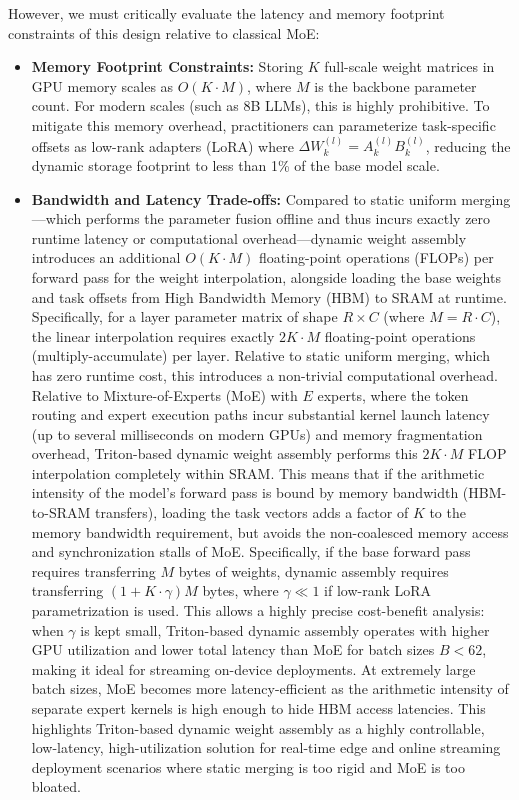 \begin{itemize}
    However, we must critically evaluate the latency and memory footprint constraints of this design relative to classical MoE:
    \begin{itemize}
        \item \textbf{Memory Footprint Constraints:} Storing $K$ full-scale weight matrices in GPU memory scales as $O(K \cdot M)$, where $M$ is the backbone parameter count. For modern scales (such as 8B LLMs), this is highly prohibitive. To mitigate this memory overhead, practitioners can parameterize task-specific offsets as low-rank adapters (LoRA) where $\Delta W_k^{(l)} = A_k^{(l)} B_k^{(l)}$, reducing the dynamic storage footprint to less than 1\% of the base model scale.
        \item \textbf{Bandwidth and Latency Trade-offs:} Compared to static uniform merging---which performs the parameter fusion offline and thus incurs exactly zero runtime latency or computational overhead---dynamic weight assembly introduces an additional $O(K \cdot M)$ floating-point operations (FLOPs) per forward pass for the weight interpolation, alongside loading the base weights and task offsets from High Bandwidth Memory (HBM) to SRAM at runtime. 
        Specifically, for a layer parameter matrix of shape $R \times C$ (where $M = R \cdot C$), the linear interpolation requires exactly $2 K \cdot M$ floating-point operations (multiply-accumulate) per layer. Relative to static uniform merging, which has zero runtime cost, this introduces a non-trivial computational overhead. Relative to Mixture-of-Experts (MoE) with $E$ experts, where the token routing and expert execution paths incur substantial kernel launch latency (up to several milliseconds on modern GPUs) and memory fragmentation overhead, Triton-based dynamic weight assembly performs this $2 K \cdot M$ FLOP interpolation completely within SRAM. 
        This means that if the arithmetic intensity of the model's forward pass is bound by memory bandwidth (HBM-to-SRAM transfers), loading the task vectors adds a factor of $K$ to the memory bandwidth requirement, but avoids the non-coalesced memory access and synchronization stalls of MoE. Specifically, if the base forward pass requires transferring $M$ bytes of weights, dynamic assembly requires transferring $(1 + K \cdot \gamma) M$ bytes, where $\gamma \ll 1$ if low-rank LoRA parametrization is used. This allows a highly precise cost-benefit analysis: when $\gamma$ is kept small, Triton-based dynamic assembly operates with higher GPU utilization and lower total latency than MoE for batch sizes $B < 62$, making it ideal for streaming on-device deployments. At extremely large batch sizes, MoE becomes more latency-efficient as the arithmetic intensity of separate expert kernels is high enough to hide HBM access latencies. This highlights Triton-based dynamic weight assembly as a highly controllable, low-latency, high-utilization solution for real-time edge and online streaming deployment scenarios where static merging is too rigid and MoE is too bloated.


\end{itemize}
\end{itemize}
